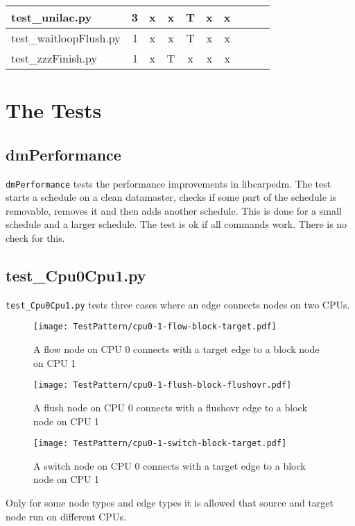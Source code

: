 \documentclass[12pt,a4paper]{report}
\begin{document}
\begin{table}
\begin{tabular}[t]{|l|r|c|c|c|c|c|c|c|c|}
test\_unilac.py                         &  3                  &   x        &   x             &   T           &   x              &   x                 \\ \hline
test\_waitloopFlush.py                  &  1                  &   x        &   x             &   T           &   x              &   x                 \\ \hline
test\_zzzFinish.py                      &  1                  &   x        &   T             &   x           &   x              &   x                 \\ \hline
\end{tabular}
\end{table}

\chapter{The Tests}
\section{dmPerformance}
\texttt{dmPerformance} tests the performance improvements in libcarpedm.
The test starts a schedule on a clean datamaster, checks if some part of
the schedule is removable, removes it and then adds another schedule.
This is done for a small schedule and a larger schedule. The test is ok
if all commands work. There is no check for this.

\section{test\_Cpu0Cpu1.py}
\texttt{test\_Cpu0Cpu1.py} tests three cases where an edge connects nodes on two CPUs.
    \begin{figure}
        \centering
        \texttt{[image: TestPattern/cpu0-1-flow-block-target.pdf]}
        \caption{A flow node on CPU 0 connects with a target edge to a block node on CPU 1}
        \label{fig:cpu0-1-flow-block-target}
    \end{figure}
    \begin{figure}
        \centering
        \texttt{[image: TestPattern/cpu0-1-flush-block-flushovr.pdf]}
        \caption{A flush node on CPU 0 connects with a flushovr edge to a block node on CPU 1}
        \label{fig:cpu0-1-flush-block-flushovr}
    \end{figure}
    \begin{figure}
        \centering
        \texttt{[image: TestPattern/cpu0-1-switch-block-target.pdf]}
        \caption{A switch node on CPU 0 connects with a target edge to a block node on CPU 1}
        \label{fig:cpu0-1-switch-block-target}
    \end{figure}
Only for some node types and edge types it is allowed that source and target node run on different CPUs.
\end{document}
